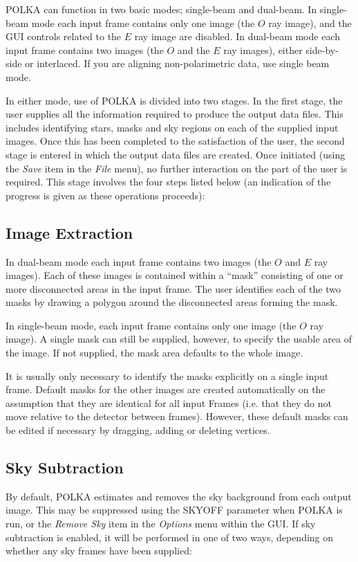 \documentclass[11pt]{article}
\newcommand{\htmlref}[2]{#1}
\newcommand{\xref}[3]{#1}
\newcommand{\xlabel}[1]{}
\newcommand{\mylabel}[1] {\xlabel{#1}\label{#1}}
\begin{document}
POLKA can function in two basic modes; single-beam and dual-beam. In
single-beam mode each input frame contains only one image (the $O$ ray
image), and the GUI controls related to the $E$ ray image are
disabled. In dual-beam mode each input frame contains two images (the $O$
and the $E$ ray images), either side-by-side or interlaced. If you are
aligning non-polarimetric data, use single beam mode.

In either mode, use of POLKA is divided into two stages. In the first
stage, the user supplies all the information required to produce the
output data files. This includes identifying stars, masks and sky regions
on each of the supplied input images. Once this has been completed to the
satisfaction of the user, the second stage is entered in which the output
data files are created. Once initiated (using the \htmlref{
\emph{Save}}{POLKA_SAVE} item in the \htmlref{\emph{File}}{POLKA_FILE_MENU}
menu), no further interaction on the part of the user is required. This
stage involves the four steps listed below (an indication of the progress
is given as these operations proceeds):

\subsection{\mylabel{POLKA_EXTRACT}Image Extraction}
In dual-beam mode each input frame contains two images (the $O$ and $E$
ray images). Each of these images is contained within a ``mask''
consisting of one or more disconnected areas in the input frame. The user
identifies each of the two masks by drawing a polygon around the
disconnected areas forming the mask.

In single-beam mode, each input frame contains only one image (the $O$
ray image). A single mask can still be supplied, however, to specify the
usable area of the image. If not supplied, the mask area defaults to the
whole image.

It is usually only necessary to identify the masks explicitly on a single
input frame. Default masks for the other images are created automatically
on the assumption that they are identical for all input Frames (i.e. that
they do not move relative to the detector between frames). However, these
default masks can be edited if necessary by dragging, adding or deleting
vertices.

\subsection {\mylabel{POLKA_SKYSUB}Sky Subtraction}
By default, POLKA estimates and removes the sky background from each
output image. This may be suppressed using the
\xref{SKYOFF}{sun223}{POLKA} parameter when POLKA is run, or the
\htmlref{\emph{Remove Sky}}{POLKA_REMOVE_SKY} item in the \htmlref{
\emph{Options}}{POLKA_OPTIONS_MENU} menu within the GUI. If sky subtraction is
enabled, it will be performed in one of two ways, depending on whether
any sky frames have been supplied:
\end{document}
